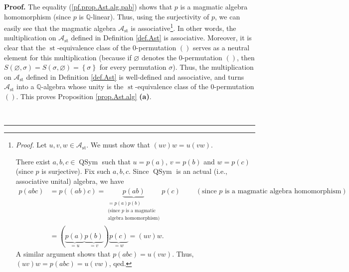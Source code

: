 \documentclass[numbers=enddot,12pt,final,onecolumn,notitlepage]{scrartcl}%
\theoremstyle{definition}
\newenvironment{proof}[1][Proof]{\noindent\textbf{#1.} }{\ \rule{0.5em}{0.5em}}
\newenvironment{verlong}{}{}
\begin{document}
\begin{verlong}
\begin{proof}
The equality (\ref{pf.prop.Ast.alg.pab}) shows that $p$ is a magmatic algebra
homomorphism (since $p$ is $\mathbb{Q}$-linear). Thus, using the surjectivity
of $p$, we can easily see that the magmatic algebra $\mathcal{A}%
_{\operatorname*{st}}$ is associative\footnote{\textit{Proof.} Let
$u,v,w\in\mathcal{A}_{\operatorname*{st}}$. We must show that $\left(
uv\right)  w=u\left(  vw\right)  $.
\par
There exist $a,b,c\in\operatorname*{QSym}$ such that $u=p\left(  a\right)  $,
$v=p\left(  b\right)  $ and $w=p\left(  c\right)  $ (since $p$ is surjective).
Fix such $a,b,c$. Since $\operatorname*{QSym}$ is an actual (i.e., associative
unital) algebra, we have%
\begin{align*}
p\left(  abc\right)   &  =p\left(  \left(  ab\right)  c\right)
=\underbrace{p\left(  ab\right)  }_{\substack{=p\left(  a\right)  p\left(
b\right)  \\\text{(since }p\text{ is a magmatic}\\\text{algebra homomorphism)}%
}}p\left(  c\right)  \ \ \ \ \ \ \ \ \ \ \left(  \text{since }p\text{ is a
magmatic algebra homomorphism}\right) \\
&  =\left(  \underbrace{p\left(  a\right)  }_{=u}\underbrace{p\left(
b\right)  }_{=v}\right)  \underbrace{p\left(  c\right)  }_{=w}=\left(
uv\right)  w.
\end{align*}
A similar argument shows that $p\left(  abc\right)  =u\left(  vw\right)  $.
Thus, $\left(  uv\right)  w=p\left(  abc\right)  =u\left(  vw\right)  $,
qed.}. In other words, the multiplication on $\mathcal{A}_{\operatorname*{st}%
}$ defined in Definition \ref{def.Ast} is associative. Moreover, it is clear
that the $\operatorname*{st}$-equivalence class of the $0$-permutation
$\left( \right)$
serves as a neutral element for this multiplication (because if $\varnothing$
denotes the $0$-permutation $\left( \right)$,
then $S\left(  \varnothing,\sigma\right)
=S\left(  \sigma,\varnothing\right)  =\left\{  \sigma\right\}  $ for every
permutation $\sigma$). Thus, the multiplication on $\mathcal{A}%
_{\operatorname*{st}}$ defined in Definition \ref{def.Ast} is well-defined and
associative, and turns $\mathcal{A}_{\operatorname*{st}}$ into a $\mathbb{Q}%
$-algebra whose unity is the $\operatorname*{st}$-equivalence class of the
$0$-permutation $\left( \right)$.
This proves Proposition \ref{prop.Ast.alg} \textbf{(a)}.


\end{proof}
\end{verlong}
\end{document}
